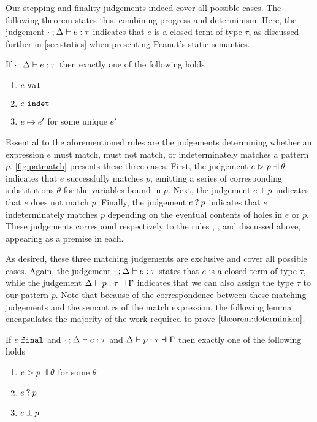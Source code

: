 Our stepping and finality judgements indeed cover all possible cases. The following theorem states this, combining progress and determinism. Here, the judgement $\cdot \mathbin{;} \Delta \vdash e : \tau$ indicates that $e$ is a closed term of type $\tau$, as discussed further in \autoref{sec:statics} when presenting Peanut's static semantics.

\begin{theorem}
	\label{theorem:determinism}
	If $\cdot \mathbin{;} \Delta \vdash e : \tau$ then exactly one of the following holds
	\begin{enumerate}
		\item $e ~\mathtt{val}$
		\item $e ~\mathtt{indet}$
		\item $e \mapsto e'$ for some unique $e'$
	\end{enumerate}
\end{theorem}

Essential to the aforementioned rules are the judgements determining whether an expression $e$ must match, must not match, or indeterminately matches a pattern $p$. \autoref{fig:patmatch} presents these three cases. First, the judgement $\hpatmatch{e}{p}{\theta}$ indicates that $e$ successfully matches $p$, emitting a series of corresponding substitutions $\theta$ for the variables bound in $p$. Next, the judgement $e \mathbin{\bot} p$ indicates that $e$ does not match $p$. Finally, the judgement $e \mathbin{?} p$ indicates that $e$ indeterminately matches $p$ depending on the eventual contents of holes in $e$ or $p$. These judgements correspond respectively to the rules \ITSuccMatch, \ITFailMatch, and \IMatch discussed above, appearing as a premise in each.

As desired, these three matching judgements are exclusive and cover all possible cases. Again, the judgement $\cdot \mathbin{;} \Delta \vdash e : \tau$ states that $e$ is a closed term of type $\tau$, while the judgement $\hpattyp{p}{\tau}{\Gamma}{\Delta}$ indicates that we can also assign the type $\tau$ to our pattern $p$. Note that because of the correspondence between these matching judgements and the semantics of the match expression, the following lemma encapsulates the majority of the work required to prove $\autoref{theorem:determinism}$.

\begin{lemma}
	\label{lemma:match-determinism}
	If $e ~\mathtt{final}$ and $\cdot \mathbin{;} \Delta \vdash e : \tau$ and $\hpattyp{p}{\tau}{\Gamma}{\Delta}$ then exactly one of the following holds
	\begin{enumerate}
		\item $\hpatmatch{e}{p}{\theta}$ for some $\theta$
		\item $e \mathbin{?} p$
		\item $e \mathbin{\bot} p$
	\end{enumerate}
\end{lemma}

